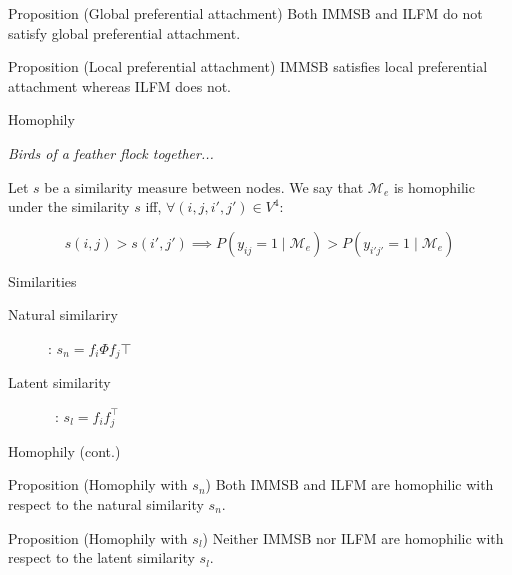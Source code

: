 \begin{frame}

\begin{block}{Proposition (Global preferential attachment)}
Both IMMSB and ILFM  do not satisfy global preferential attachment.
\end{block}

\vspace{1em}

\begin{block}{Proposition (Local preferential attachment)}
IMMSB satisfies local preferential attachment whereas ILFM does not.
\end{block}

\end{frame}


\begin{frame}[c]{Homophily}

\emph{Birds of a feather flock together...}
\vspace{2em}

\begin{definition}[Homophily]
Let $s$ be a similarity measure between nodes. 
We say that $\mathcal{M}_e$ is homophilic under the similarity $s$ iff, $\forall (i,j,i',j') \in V^4$:

\[ s(i,j) > s(i',j')  \implies P(y_{ij}=1 \mid \mathcal{M}_e) > P(y_{i'j'}=1  \mid \mathcal{M}_e) \]

\end{definition}

\begin{block}{Similarities}
    \begin{description}
    \item[Natural similariry] : $s_n = f_i \Phi f_j\top $
    \item[Latent similarity] \ : $s_l = f_i f_j^\top$
    \end{description} 
\end{block}

\end{frame}

\begin{frame}{Homophily (cont.)}

\begin{block}{Proposition (Homophily with $s_n$)}
Both IMMSB and ILFM are homophilic with respect to the natural similarity $s_n$.
\end{block}

\vspace{2em}

\begin{block}{Proposition (Homophily with $s_l$)}
Neither IMMSB nor ILFM are homophilic with respect to the latent similarity $s_l$.
\end{block}

\end{frame}



